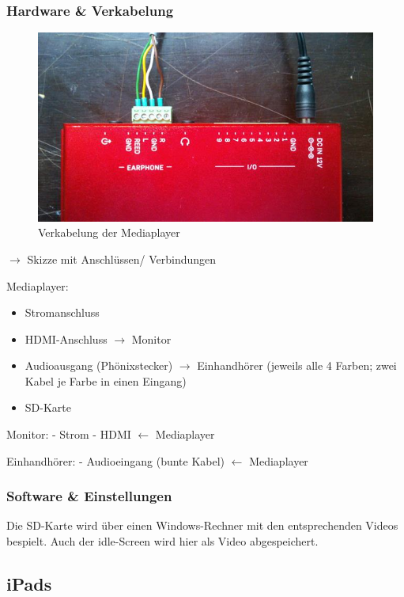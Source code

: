 \documentclass [titlepage,a4paper]{article}
\begin{document}
\subsubsection{Hardware \& Verkabelung}

\begin{figure} [H]
    \centering
    \includegraphics [width=1\textwidth]{images/AP01_Wiring_Detail.jpg}
    \caption{Verkabelung der Mediaplayer}
    \label{verkabelung_mediaplayer}
\end{figure}

$\rightarrow$ Skizze mit Anschlüssen/ Verbindungen

Mediaplayer:
\begin{itemize}
    \item Stromanschluss
    \item HDMI-Anschluss $\rightarrow$ Monitor
    \item Audioausgang (Phönixstecker) $\rightarrow$ Einhandhörer (jeweils alle 4 Farben; zwei Kabel je Farbe in einen Eingang)
    \item SD-Karte
\end{itemize}



Monitor:
- Strom
- HDMI $\leftarrow$ Mediaplayer

Einhandhörer:
- Audioeingang (bunte Kabel) $\leftarrow$ Mediaplayer

\subsubsection{Software \& Einstellungen}

Die SD-Karte wird über einen Windows-Rechner mit den entsprechenden Videos bespielt. Auch der idle-Screen wird hier als Video abgespeichert.

\subsection{iPads}
\end{document}
